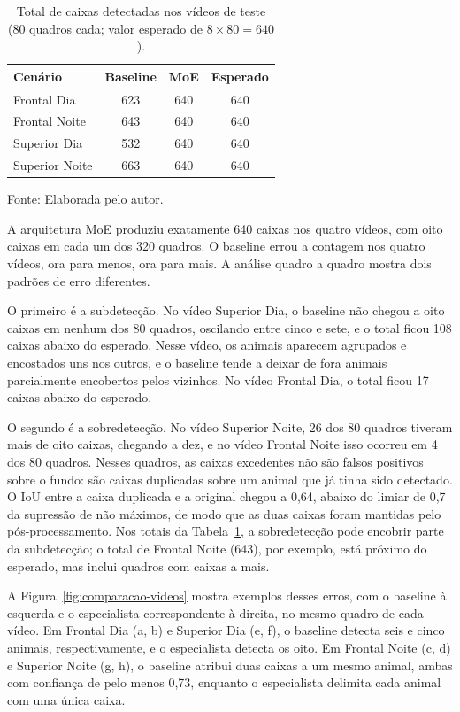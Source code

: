 \begin{table}[htb]
\centering
\caption{Total de caixas detectadas nos vídeos de teste (80 quadros cada; valor esperado de $8 \times 80 = 640$).}
\label{tab:res-contagem}
\begin{tabular}{lccc}
\hline
\textbf{Cenário} & \textbf{Baseline} & \textbf{MoE} & \textbf{Esperado} \\
\hline
Frontal Dia & 623 & 640 & 640 \\
Frontal Noite & 643 & 640 & 640 \\
Superior Dia & 532 & 640 & 640 \\
Superior Noite & 663 & 640 & 640 \\
\hline
\end{tabular}

\vspace{0.2cm}
Fonte: Elaborada pelo autor.
\end{table}

A arquitetura MoE produziu exatamente 640 caixas nos quatro vídeos, com oito caixas em cada um dos 320 quadros. O baseline errou a contagem nos quatro vídeos, ora para menos, ora para mais. A análise quadro a quadro mostra dois padrões de erro diferentes.

O primeiro é a subdetecção. No vídeo Superior Dia, o baseline não chegou a oito caixas em nenhum dos 80 quadros, oscilando entre cinco e sete, e o total ficou 108 caixas abaixo do esperado. Nesse vídeo, os animais aparecem agrupados e encostados uns nos outros, e o baseline tende a deixar de fora animais parcialmente encobertos pelos vizinhos. No vídeo Frontal Dia, o total ficou 17 caixas abaixo do esperado.

O segundo é a sobredetecção. No vídeo Superior Noite, 26 dos 80 quadros tiveram mais de oito caixas, chegando a dez, e no vídeo Frontal Noite isso ocorreu em 4 dos 80 quadros. Nesses quadros, as caixas excedentes não são falsos positivos sobre o fundo: são caixas duplicadas sobre um animal que já tinha sido detectado. O IoU entre a caixa duplicada e a original chegou a 0,64, abaixo do limiar de 0,7 da supressão de não máximos, de modo que as duas caixas foram mantidas pelo pós-processamento. Nos totais da Tabela~\ref{tab:res-contagem}, a sobredetecção pode encobrir parte da subdetecção; o total de Frontal Noite (643), por exemplo, está próximo do esperado, mas inclui quadros com caixas a mais.

A Figura~\ref{fig:comparacao-videos} mostra exemplos desses erros, com o baseline à esquerda e o especialista correspondente à direita, no mesmo quadro de cada vídeo. Em Frontal Dia (a, b) e Superior Dia (e, f), o baseline detecta seis e cinco animais, respectivamente, e o especialista detecta os oito. Em Frontal Noite (c, d) e Superior Noite (g, h), o baseline atribui duas caixas a um mesmo animal, ambas com confiança de pelo menos 0,73, enquanto o especialista delimita cada animal com uma única caixa.

